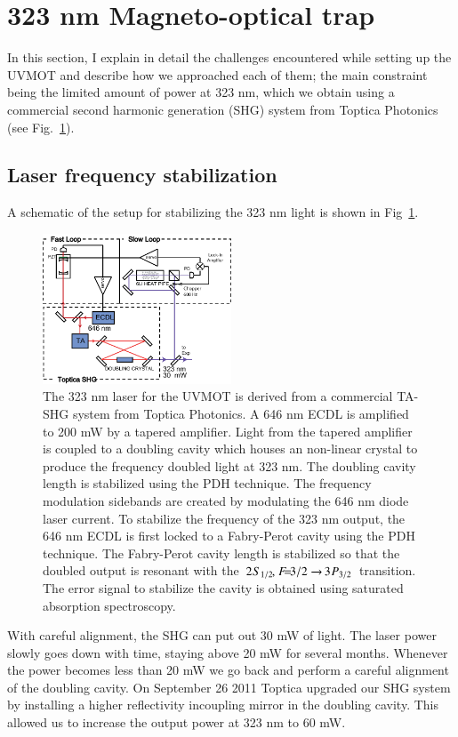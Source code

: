 \documentclass[oneside,12pt]{memoir}
\newcommand{\twos}[1]{\ensuremath{\hspace{-1pt}2\hspace{0.5pt}\hspace{0pt}S_{#1}\hspace{-1pt}}}
\newcommand{\trep}[1]{\ensuremath{\hspace{-1pt}3\hspace{0.5pt}\hspace{0pt}P_{#1}\hspace{-1pt}}}
\newcommand{\cm}{\ensuremath{,\hspace{1pt}}}
\newcommand{\f}[1]{\ensuremath{F\hspace{-5pt}=\hspace{-4pt}#1}}
\begin{document}
\section{323 nm Magneto-optical trap}

In this section, I explain in detail the challenges encountered while setting
up the UVMOT and describe how we approached each of them; the main constraint
being the limited amount of power at 323 nm, which we obtain using a commercial
second harmonic generation (SHG) system from Toptica Photonics (see
Fig.~\ref{fig:shgsetup}).  


\subsection{Laser frequency stabilization}

A schematic of the setup for stabilizing the 323 nm light is shown in
Fig~\ref{fig:shgsetup}.  \begin{figure} \centering
\includegraphics[width=0.5\textwidth]{../figures/323setup/323setup.pdf}
\caption[Schematic of stabilization setup for 323 nm laser]{\small The 323 nm
laser for the UVMOT is derived from a commercial TA-SHG system from Toptica
Photonics.  A 646 nm ECDL is amplified to 200 mW by a tapered amplifier.  Light
from the tapered amplifier is coupled to a doubling cavity which houses an
non-linear crystal to produce the frequency doubled light at 323 nm.  The
doubling cavity length is stabilized using the PDH technique.  The frequency
modulation sidebands are created by modulating the 646 nm diode laser current.
To stabilize the frequency of the 323 nm output, the 646 nm ECDL is first
locked to a Fabry-Perot cavity using the PDH technique.   The Fabry-Perot
cavity length is stabilized so that the doubled output is resonant with the
\,$\twos{1/2}\cm\f{3/2}\rightarrow\trep{3/2}$\, transition.  The error signal
to stabilize the cavity is obtained using  saturated absorption spectroscopy. }
\label{fig:shgsetup} \end{figure} With careful alignment, the SHG can put out
30 mW of light. The laser power slowly goes down with time, staying above 20 mW
for several months.  Whenever the power becomes less than 20 mW we go back and
perform a careful alignment of the doubling cavity.  On September 26  2011
Toptica upgraded our SHG system by installing a higher reflectivity incoupling
mirror in the doubling cavity.  This allowed us to increase the output power at
323 nm to 60 mW.  
\end{document}
